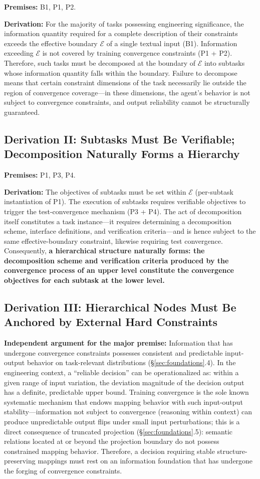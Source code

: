 \documentclass[11pt,a4paper]{article}
\theoremstyle{definition}
\newcommand{\effcap}{\mathcal{E}}
\begin{document}
\textbf{Premises:} B1, P1, P2.

\textbf{Derivation:} For the majority of tasks possessing engineering significance, the information quantity required for a complete description of their constraints exceeds the effective boundary $\effcap$ of a single textual input (B1). Information exceeding $\effcap$ is not covered by training convergence constraints (P1 + P2). Therefore, such tasks must be decomposed at the boundary of $\effcap$ into subtasks whose information quantity falls within the boundary. Failure to decompose means that certain constraint dimensions of the task necessarily lie outside the region of convergence coverage---in these dimensions, the agent's behavior is not subject to convergence constraints, and output reliability cannot be structurally guaranteed.

\subsection{Derivation II: Subtasks Must Be Verifiable; Decomposition Naturally Forms a Hierarchy}

\textbf{Premises:} P1, P3, P4.

\textbf{Derivation:} The objectives of subtasks must be set within $\effcap$ (per-subtask instantiation of P1). The execution of subtasks requires verifiable objectives to trigger the test-convergence mechanism (P3 + P4). The act of decomposition itself constitutes a task instance---it requires determining a decomposition scheme, interface definitions, and verification criteria---and is hence subject to the same effective-boundary constraint, likewise requiring test convergence. Consequently, \textbf{a hierarchical structure naturally forms: the decomposition scheme and verification criteria produced by the convergence process of an upper level constitute the convergence objectives for each subtask at the lower level.}

\subsection{Derivation III: Hierarchical Nodes Must Be Anchored by External Hard Constraints}

\textbf{Independent argument for the major premise:} Information that has undergone convergence constraints possesses consistent and predictable input-output behavior on task-relevant distributions (\S\ref{sec:foundations}.4). In the engineering context, a ``reliable decision'' can be operationalized as: within a given range of input variation, the deviation magnitude of the decision output has a definite, predictable upper bound. Training convergence is the sole known systematic mechanism that endows mapping behavior with such input-output stability---information not subject to convergence (reasoning within context) can produce unpredictable output flips under small input perturbations; this is a direct consequence of truncated projection (\S\ref{sec:foundations}.5): semantic relations located at or beyond the projection boundary do not possess constrained mapping behavior. Therefore, a decision requiring stable structure-preserving mappings must rest on an information foundation that has undergone the forging of convergence constraints.
\end{document}
